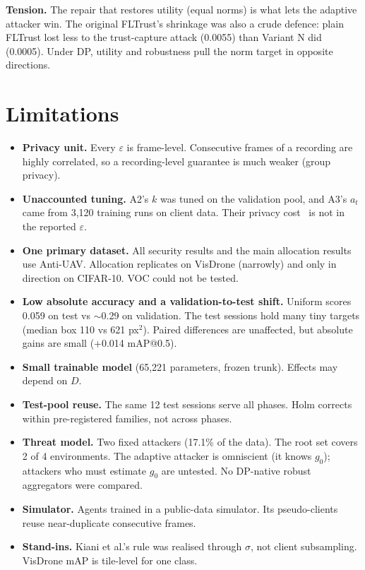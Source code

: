 \documentclass[journal]{IEEEtran}
\makeatletter
\newcommand{\eps}{\varepsilon}
\newcommand{\mAP}{mAP@0.5}
\makeatother
\begin{document}
\textbf{Tension.} The repair that restores utility (equal norms) is what lets the adaptive attacker
win. The original FLTrust's shrinkage was also a crude defence: plain FLTrust lost less to the
trust-capture attack (0.0055) than Variant N did (0.0005). Under DP, utility and robustness pull the
norm target in opposite directions.

\section{Limitations}
\label{sec:limits}
\begin{itemize}
  \item \textbf{Privacy unit.} Every $\eps$ is frame-level. Consecutive frames of a recording are
  highly correlated, so a recording-level guarantee is much weaker (group privacy).
  \item \textbf{Unaccounted tuning.} A2's $k$ was tuned on the validation pool, and A3's $a_t$ came
  from 3,120 training runs on client data. Their privacy cost~\cite{papernot2022hyperparam} is not in
  the reported $\eps$.
  \item \textbf{One primary dataset.} All security results and the main allocation results use
  Anti-UAV. Allocation replicates on VisDrone (narrowly) and only in direction on CIFAR-10. VOC
  could not be tested.
  \item \textbf{Low absolute accuracy and a validation-to-test shift.} Uniform scores 0.059 on test
  vs $\sim$0.29 on validation. The test sessions hold many tiny targets (median box 110 vs 621
  px$^2$). Paired differences are unaffected, but absolute gains are small (+0.014 \mAP).
  \item \textbf{Small trainable model} (65,221 parameters, frozen trunk). Effects may depend on $D$.
  \item \textbf{Test-pool reuse.} The same 12 test sessions serve all phases. Holm corrects within
  pre-registered families, not across phases.
  \item \textbf{Threat model.} Two fixed attackers (17.1\% of the data). The root set covers 2 of 4
  environments. The adaptive attacker is omniscient (it knows $g_0$); attackers who must estimate
  $g_0$ are untested. No DP-native robust aggregators were compared.
  \item \textbf{Simulator.} Agents trained in a public-data simulator. Its pseudo-clients reuse
  near-duplicate consecutive frames.
  \item \textbf{Stand-ins.} Kiani et al.'s rule was realised through $\sigma$, not client subsampling.
  VisDrone mAP is tile-level for one class.
\end{itemize}
\end{document}
